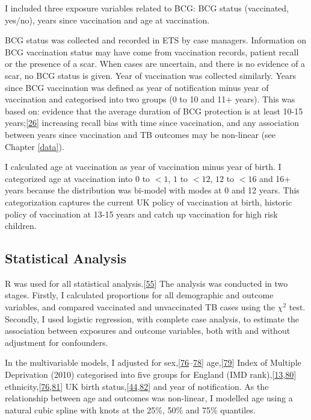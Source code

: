 \documentclass[11pt,twoside]{bristolthesis}
\begin{document}
  I included three exposure variables related to BCG: BCG status (vaccinated, yes/no), years since vaccination and age at vaccination.
  
  BCG status was collected and recorded in ETS by case managers. Information on BCG vaccination status may have come from vaccination records, patient recall or the presence of a scar. When cases are uncertain, and there is no evidence of a scar, no BCG status is given. Year of vaccination was collected similarly. Years since BCG vaccination was defined as year of notification minus year of vaccination and categorised into two groups (0 to 10 and 11+ years). This was based on: evidence that the average duration of BCG protection is at least 10-15 years;{[}\protect\hyperlink{ref-Abubakar2013}{26}{]} increasing recall bias with time since vaccination, and any association between years since vaccination and TB outcomes may be non-linear (see Chapter \ref{data}).
  
  I calculated age at vaccination as year of vaccination minus year of birth. I categorized age at vaccination into \(0\) to \(< 1\), \(1\) to \(< 12\), \(12\) to \(< 16\) and 16+ years because the distribution was bi-model with modes at 0 and 12 years. This categorization captures the current UK policy of vaccination at birth, historic policy of vaccination at 13-15 years and catch up vaccination for high risk children.
  
  \hypertarget{statistical-analysis-1}{%
  \subsection{Statistical Analysis}\label{statistical-analysis-1}}
  
  R was used for all statistical analysis.{[}\protect\hyperlink{ref-R}{55}{]} The analysis was conducted in two stages. Firstly, I calculated proportions for all demographic and outcome variables, and compared vaccinated and unvaccinated TB cases using the \(\chi ^2\) test. Secondly, I used logistic regression, with complete case analysis, to estimate the association between exposures and outcome variables, both with and without adjustment for confounders.
  
  In the multivariable models, I adjusted for sex,{[}\protect\hyperlink{ref-Parslow2001}{76}--\protect\hyperlink{ref-Aaby2014}{78}{]} age,{[}\protect\hyperlink{ref-Teale1993}{79}{]} Index of Multiple Deprivation (2010) categorised into five groups for England (IMD rank),{[}\protect\hyperlink{ref-Bhatti1995}{13},\protect\hyperlink{ref-DCLG2011}{80}{]} ethnicity,{[}\protect\hyperlink{ref-Parslow2001}{76},\protect\hyperlink{ref-Abubakar2008}{81}{]} UK birth status,{[}\protect\hyperlink{ref-French2007}{44},\protect\hyperlink{ref-Djuretic2002}{82}{]} and year of notification. As the relationship between age and outcomes was non-linear, I modelled age using a natural cubic spline with knots at the 25\%, 50\% and 75\% quantiles.
  
\end{document}
